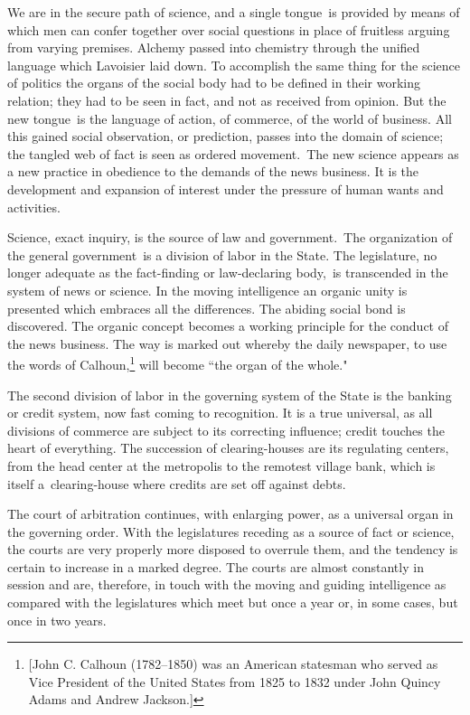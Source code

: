 \documentclass[twoside,symmetric,nobib,justified]{tufte-book}
\begin{document}
We are in the secure path of science, and a single tongue~is provided by
means of which men can confer together over social questions in place of
fruitless arguing from varying premises. Alchemy passed into chemistry
through the unified language which Lavoisier laid down. To accomplish
the same thing for the science of politics the organs of the social body
had to be defined in their working relation; they had to be seen in
fact, and not as received from opinion. But the new tongue~is the
language of action, of commerce, of the world of business. All this
gained social observation, or prediction, passes into the domain of
science; the tangled web of fact is seen as ordered movement.~The new
science appears as a new practice in obedience to the demands of the
news business. It is the development and expansion of interest under the
pressure of human wants and activities.~

Science, exact inquiry, is the source of law and government.~The
organization of the general government~is a division of labor in the
State. The legislature, no longer adequate as the fact-finding or
law-declaring body,~is transcended in the system of news or science. In
the moving intelligence an organic unity is presented which embraces all
the differences. The abiding social bond is discovered. The organic
concept becomes a working principle for the conduct of the news
business. The way is marked out whereby the daily newspaper, to use the
words of Calhoun,\footnote{{[}John C. Calhoun (1782--1850) was an
  American statesman who served as Vice President of the United States
  from 1825 to 1832 under John Quincy Adams and Andrew Jackson.{]}} will
become ``the organ of the whole."~

The second division of labor in the governing system of the State is the
banking or credit system, now fast coming to recognition. It is a true
universal, as all divisions of commerce are subject to its correcting
influence; credit touches the heart of everything. The succession of
clearing-houses are its regulating centers, from the head center at the
metropolis to the remotest village bank, which is itself
a~clearing-house where credits are set off against debts.~

The court of arbitration continues, with enlarging power, as a universal
organ in the governing order. With the legislatures receding as a source
of fact or science, the courts are very properly more disposed to
overrule them, and the tendency is certain to increase in a marked
degree. The courts are almost constantly in session and are, therefore,
in touch with the moving and guiding intelligence as compared with the
legislatures which meet but once a year or, in some cases, but once in
two years.~
\end{document}
